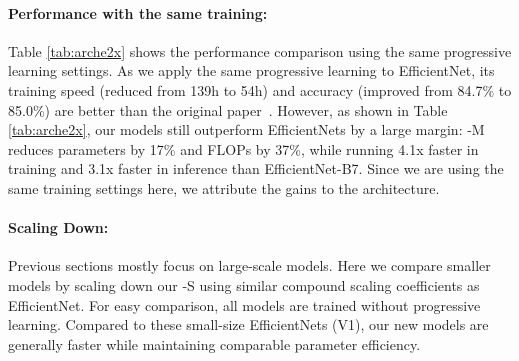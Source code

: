 \documentclass{article}
\begin{document}
\paragraph{Performance with the same training:}  Table \ref{tab:arche2x} shows the performance comparison using the same progressive learning settings. As we apply the same progressive learning to EfficientNet, its training speed (reduced from 139h to 54h) and accuracy (improved from 84.7\% to 85.0\%) are better than the original paper~\cite{efficientnet19}. However, as shown in Table \ref{tab:arche2x}, our {\xnet} models still outperform EfficientNets by a large margin: {\xnet}-M reduces parameters by 17\% and FLOPs by 37\%, while running 4.1x faster in training and 3.1x faster in inference than EfficientNet-B7. Since we are using the same training settings here, we attribute the gains to the {\xnet} architecture.

\begin{table}[h]
    \vskip -0.1in
    \caption{
        Comparison with the same training settings -- 
Our new {\xnet}-M runs faster with less parameters.
       }
    \centering
    \label{tab:arche2x}
    \vskip -0.1in
\end{table} 
\paragraph{Scaling Down:} Previous sections mostly focus on large-scale models. Here we compare smaller models by scaling down our {\xnet}-S using similar compound scaling coefficients as EfficientNet. For easy comparison, all models are trained without progressive learning. Compared to these small-size EfficientNets (V1), our new {\xnet} models are generally faster while maintaining comparable parameter efficiency. 
\end{document}
